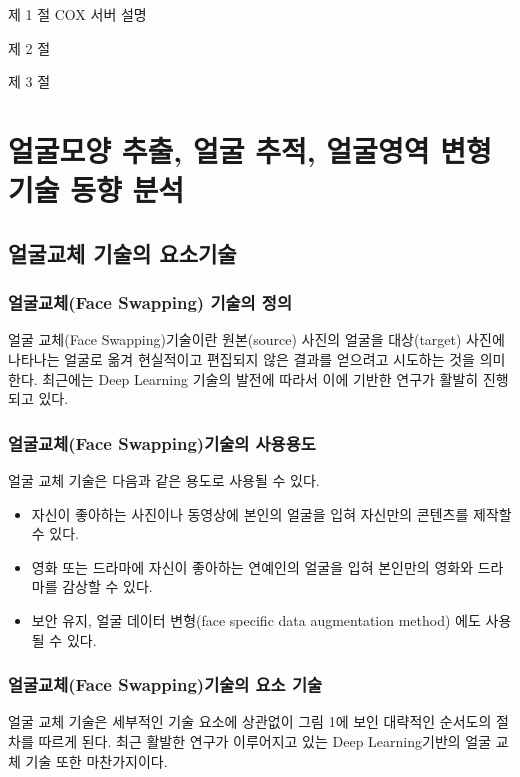 \documentclass{oblivoir}
\begin{document}
제  1  절 COX 서버 설명

제  2  절 

제  3  절 

\chapter{얼굴모양 추출, 얼굴 추적, 얼굴영역 변형 기술 동향 분석 }

\section{얼굴교체 기술의 요소기술}

\subsection{ 얼굴교체(Face Swapping) 기술의 정의}

얼굴 교체(Face Swapping)기술이란 원본(source) 사진의 얼굴을 대상(target) 사진에 나타나는 얼굴로 옮겨 현실적이고 편집되지 않은 결과를 얻으려고 시도하는 것을 의미한다. 최근에는 Deep Learning 기술의 발전에 따라서 이에 기반한 연구가 활발히 진행되고 있다.

\subsection{ 얼굴교체(Face Swapping)기술의 사용용도}

얼굴 교체 기술은 다음과 같은 용도로 사용될 수 있다.

\begin{itemize}
    \item 자신이 좋아하는 사진이나 동영상에 본인의 얼굴을 입혀 자신만의 콘텐츠를 제작할 수 있다.
    \item 영화 또는 드라마에 자신이 좋아하는 연예인의 얼굴을 입혀 본인만의 영화와 드라마를 감상할 수 있다.
    \item 보안 유지, 얼굴 데이터 변형(face specific data augmentation method) 에도 사용될 수 있다.
\end{itemize}

\subsection{ 얼굴교체(Face Swapping)기술의 요소 기술}

얼굴 교체 기술은 세부적인 기술 요소에 상관없이 그림 1에 보인 대략적인 순서도의 절차를 따르게 된다. 최근 활발한 연구가 이루어지고 있는 Deep Learning기반의 얼굴 교체 기술 또한 마찬가지이다. 
\end{document}
